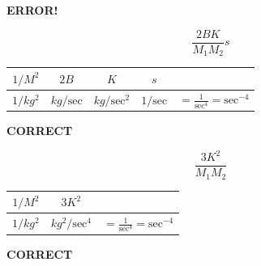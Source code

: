 \begin{ExampleSmall}
\vspace{0.075in}
{\bf ERROR!}


\[
\frac{2BK}{M_1M_2}s
\]


\begin{tabular}{c|c|c|c|c}
$1/M^2$	  & $2B$		& $K$	& $s$ & \\ \hline
$1/kg^2$  & $kg/\mathrm{sec}$	& $kg/\mathrm{sec}^2$	& $1/\mathrm{sec}$	& $= \frac{1}{\mathrm{sec}^4} = \mathrm{sec}^{-4}$
\end{tabular}

\vspace{0.075in}
{\bf CORRECT}


\[
\frac{3K^2}{M_1M_2}
\]


\begin{tabular}{c|c|c}
$1/M^2$	& $3K^2$   & \\ \hline
$1/kg^2$  & $kg^2/\mathrm{sec}^4$	& $= \frac{1}{\mathrm{sec}^4} = \mathrm{sec}^{-4}$
\end{tabular}

\vspace{0.075in}
{\bf CORRECT}



\end{ExampleSmall}





